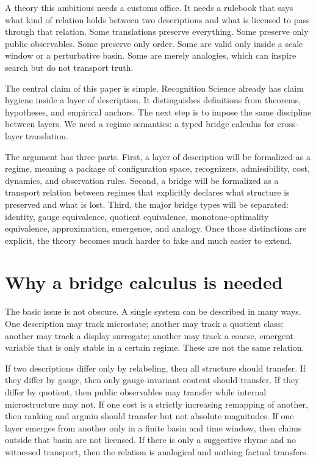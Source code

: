 \documentclass[11pt]{article}
\begin{document}
A theory this ambitious needs a customs office. It needs a rulebook that says what kind of relation holds between two descriptions and what is licensed to pass through that relation. Some translations preserve everything. Some preserve only public observables. Some preserve only order. Some are valid only inside a scale window or a perturbative basin. Some are merely analogies, which can inspire search but do not transport truth.

The central claim of this paper is simple. Recognition Science already has claim hygiene inside a layer of description. It distinguishes definitions from theorems, hypotheses, and empirical anchors. The next step is to impose the same discipline between layers. We need a regime semantics: a typed bridge calculus for cross-layer translation.

The argument has three parts. First, a layer of description will be formalized as a regime, meaning a package of configuration space, recognizers, admissibility, cost, dynamics, and observation rules. Second, a bridge will be formalized as a transport relation between regimes that explicitly declares what structure is preserved and what is lost. Third, the major bridge types will be separated: identity, gauge equivalence, quotient equivalence, monotone-optimality equivalence, approximation, emergence, and analogy. Once those distinctions are explicit, the theory becomes much harder to fake and much easier to extend.

\section{Why a bridge calculus is needed}

The basic issue is not obscure. A single system can be described in many ways. One description may track microstate; another may track a quotient class; another may track a display surrogate; another may track a coarse, emergent variable that is only stable in a certain regime. These are not the same relation.

If two descriptions differ only by relabeling, then all structure should transfer. If they differ by gauge, then only gauge-invariant content should transfer. If they differ by quotient, then public observables may transfer while internal microstructure may not. If one cost is a strictly increasing remapping of another, then ranking and argmin should transfer but not absolute magnitudes. If one layer emerges from another only in a finite basin and time window, then claims outside that basin are not licensed. If there is only a suggestive rhyme and no witnessed transport, then the relation is analogical and nothing factual transfers.
\end{document}
